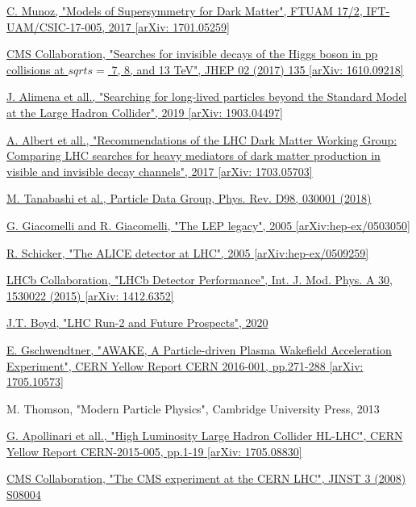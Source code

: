 \documentclass[a4paper, 10pt, openright]{report}
\begin{document}
\begin{thebibliography}{1}
\href{https://arxiv.org/abs/1701.05259}{C. Munoz,
"Models of Supersymmetry for Dark Matter",
FTUAM 17/2, IFT-UAM/CSIC-17-005, 2017 [arXiv: 1701.05259]
}

\href{https://arxiv.org/abs/1610.09218}{CMS Collaboration,
"Searches for invisible decays of the Higgs boson in pp collisions at $sqrt{s} =$ 7, 8, and 13 TeV",
JHEP 02 (2017) 135 [arXiv: 1610.09218]
}

\href{https://arxiv.org/abs/1903.04497?}{J. Alimena et all.,
"Searching for long-lived particles beyond the Standard Model at the Large Hadron Collider",
2019 [arXiv: 1903.04497]
}

\href{https://arxiv.org/abs/1703.05703}{A. Albert et all.,
"Recommendations of the LHC Dark Matter Working Group: Comparing LHC searches for heavy mediators of dark matter production in visible and invisible decay channels",
2017 [arXiv: 1703.05703]
}

\href{http://pdg.lbl.gov/}{M. Tanabashi et al.,
Particle Data Group,
Phys. Rev. D98, 030001 (2018)}

\href{https://arxiv.org/abs/hep-ex/0503050}{G. Giacomelli and R. Giacomelli,
"The LEP legacy", 
2005 [arXiv:hep-ex/0503050]}

\href{https://arxiv.org/abs/hep-ph/0509259}{R. Schicker,
"The ALICE detector at LHC",
2005 [arXiv:hep-ex/0509259]
}

\href{https://arxiv.org/abs/1412.6352}{LHCb Collaboration,
"LHCb Detector Performance",
Int. J. Mod. Phys. A 30, 1530022 (2015) [arXiv: 1412.6352]
}

\href{https://www.researchgate.net/publication/338569771_LHC_Run-2_and_Future_Prospects}{J.T. Boyd,
"LHC Run-2 and Future Prospects",
2020}

\href{https://arxiv.org/abs/1705.10573}{E. Gschwendtner,
"AWAKE, A Particle-driven Plasma Wakefield Acceleration Experiment",
CERN Yellow Report CERN 2016-001, pp.271-288 [arXiv: 1705.10573]
}

M. Thomson,
"Modern Particle Physics",
Cambridge University Press, 2013

\href{https://arxiv.org/abs/1705.08830}{G. Apollinari et all.,
"High Luminosity Large Hadron Collider HL-LHC",
CERN Yellow Report CERN-2015-005, pp.1-19 [arXiv: 1705.08830]
}

\href{https://iopscience.iop.org/article/10.1088/1748-0221/3/08/S08004/pdf}{CMS Collaboration,
"The CMS experiment at the CERN LHC",
JINST 3 (2008) S08004
}


\end{thebibliography}
\end{document}
